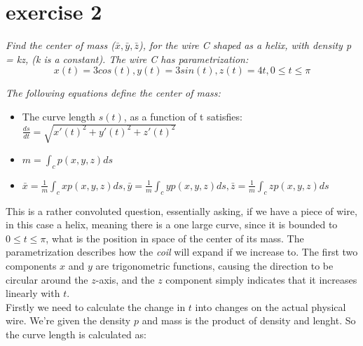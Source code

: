 \section{exercise 2}
\textit{Find the center of mass ($\bar{x},\bar{y},\bar{z}$), for the wire C shaped as a helix, with density p = kz, (k is a constant).
The wire C has parametrization:}
\[
x(t) = 3cos(t), y(t)=3sin(t), z(t)=4t, 0\leq t \leq \pi
\]

\textit{The following equations define the center of mass:}
\begin{itemize}
    \item The curve length $s(t)$, as a function of t satisfies: $\frac{ds}{dt} = \sqrt{x'(t)^2 + y'(t)^2 + z'(t)^2}$
    \item $m = \int_c p(x,y,z)ds$
    \item $\bar{x} = \frac{1}{m} \int_c xp(x,y,z)ds, \bar{y} = \frac{1}{m}\int_c yp(x,y,z)ds, \bar{z}=\frac{1}{m}\int_c zp(x,y,z)ds$ 
\end{itemize}

This is a rather convoluted question, essentially asking, if we have a piece of wire, in this case a 
helix, meaning there is a one large curve, since it is bounded to $0\leq t \leq \pi$, what is the 
position in space of the center of its mass. The parametrization describes how the \textit{coil} will 
expand if we increase to. The first two components $x$ and $y$ are trigonometric functions, causing the
direction to be circular around the $z$-axis, and the $z$ component simply indicates that it increases
linearly with $t$.\\

Firstly we need to calculate the change in $t$ into changes on the actual physical wire. We're given the
density $p$ and mass is the product of density and lenght. So the curve length is calculated as:


